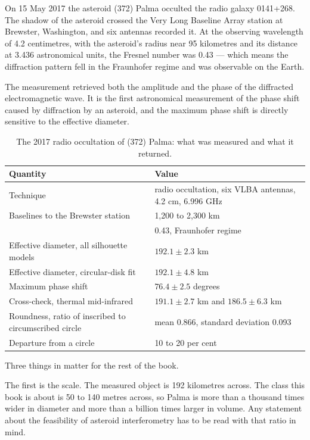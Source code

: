 On 15 May 2017 the asteroid (372) Palma occulted the radio galaxy
0141+268. The shadow of the asteroid crossed the Very Long Baseline Array
station at Brewster, Washington, and six  antennas recorded it. At the
observing wavelength of 4.2 centimetres, with the asteroid's radius near
95 kilometres and its distance at 3.436 astronomical units, the Fresnel
number was 0.43 --- which means the diffraction pattern fell in the
Fraunhofer regime and was observable on the Earth.

The measurement retrieved both the amplitude and the phase of the diffracted
electromagnetic wave. It is the first astronomical measurement of the phase
shift caused by diffraction by an asteroid, and the maximum phase shift is
directly sensitive to the effective diameter.

\begin{table}[!htbp]
\centering
\small
\caption{The 2017 radio occultation of (372) Palma: what was measured and
what it returned.}
\label{tab:palma}
\begin{tabularx}{\textwidth}{@{}P{2.57in}Y@{}}
\toprule
{}
\textbf{Quantity} & \textbf{Value} \\
\midrule
Technique & radio occultation, six VLBA antennas, 4.2 cm, 6.996 GHz \\
Baselines to the Brewster station & 1,200 to 2,300 km \\
 & 0.43, Fraunhofer regime \\
Effective diameter, all silhouette models & \(192.1 \pm 2.3\) km \\
Effective diameter, circular-disk fit & \(192.1 \pm 4.8\) km \\
Maximum phase shift & \(76.4 \pm 2.5\) degrees \\
Cross-check, thermal mid-infrared & \(191.1 \pm 2.7\) km and
\(186.5 \pm 6.3\) km \\
Roundness, ratio of inscribed to circumscribed circle & mean 0.866, standard
deviation 0.093 \\
Departure from a circle & 10 to 20 per cent \\
\bottomrule
\end{tabularx}
\end{table}

Three things in  matter for the rest of the book.

The first is the scale. The measured object is 192 kilometres across. The
class this book is about is 50 to 140 metres across, so Palma is more than
a thousand times wider in diameter and more than a billion times larger in
volume. Any statement about the feasibility of asteroid interferometry has
to be read with that ratio in mind.

